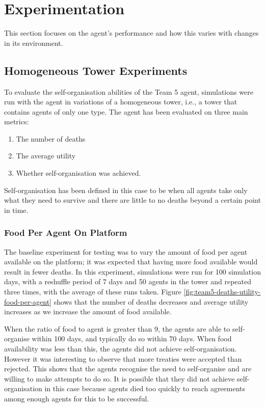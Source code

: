 \section{Experimentation}\label{sec:team5-experimentation}
This section focuses on the agent's performance and how this varies with changes in its environment.

\subsection*{Homogeneous Tower Experiments}
To evaluate the self-organisation abilities of the Team 5 agent, simulations were run with the agent in variations of a homogeneous tower, i.e., a tower that contains agents of only one type. The agent has been evaluated on three main metrics:
\begin{enumerate}
    \item The number of deaths
    \item The average utility
    \item Whether self-organisation was achieved.
\end{enumerate}
Self-organisation has been defined in this case to be when all agents take only what they need to survive and there are little to no deaths beyond a certain point in time.

\subsubsection*{Food Per Agent On Platform}
The baseline experiment for testing was to vary the amount of food per agent available on the platform; it was expected that having more food available would result in fewer deaths. In this experiment, simulations were run for 100 simulation days, with a reshuffle period of 7 days and 50 agents in the tower and repeated three times, with the average of these runs taken. Figure \ref{fig:team5-deaths-utility-food-per-agent} shows that the number of deaths decreases and average utility increases as we increase the amount of food available.

When the ratio of food to agent is greater than 9, the agents are able to self-organise within 100 days, and typically do so within 70 days. When food availability was less than this, the agents did not achieve self-organisation. However it was interesting to observe that more treaties were accepted than rejected. This shows that the agents recognise the need to self-organise and are willing to make attempts to do so. It is possible that they did not achieve self-organisation in this case because agents died too quickly to reach agreements among enough agents for this to be successful.

